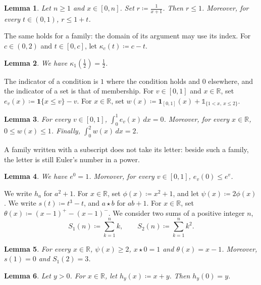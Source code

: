\documentclass{article}
\newtheorem{lemma}{Lemma}
\begin{document}
\begin{lemma}\label{lem:dependent-domain}
Let $n\ge1$ and $x\in[0,n]$.
Set $r\coloneqq\frac{1}{x+1}$.
Then $r\le1$.
Moreover, for every $t\in(0,1)$, $r\le1+t$.
\end{lemma}

The same holds for a family: the domain of its argument may use its index.
For $c\in(0,2)$ and $t\in[0,c]$, let $\kappa_c(t)\coloneqq c-t$.

\begin{lemma}\label{lem:dependent-family}
We have $\kappa_1(\frac12)=\frac12$.
\end{lemma}

The indicator of a condition is $1$ where the condition holds and $0$ elsewhere, and the indicator of a set is that of membership.
For $v\in[0,1]$ and $x\in\mathbb{R}$, set $e_v(x)\coloneqq\mathbf 1\{x\le v\}-v$.
For $x\in\mathbb{R}$, set $w(x)\coloneqq\mathbf{1}_{[0,1]}(x)+\mathbb{1}_{\{1<x,\ x\le2\}}$.

\begin{lemma}\label{lem:indicator}
For every $v\in[0,1]$, $\int_0^1e_v(x)\,dx=0$.
Moreover, for every $x\in\mathbb{R}$, $0\le w(x)\le1$.
Finally, $\int_0^2w(x)\,dx=2$.
\end{lemma}

A family written with a subscript does not take its letter: beside such a family, the
letter is still Euler's number in a power.

\begin{lemma}\label{lem:euler}
We have $e^0=1$.
Moreover, for every $v\in[0,1]$, $e_v(0)\le e^v$.
\end{lemma}

We write $h_a$ for $a^2+1$.
For $x\in\mathbb{R}$, set $\phi(x)\coloneqq x^2+1$, and let $\psi(x)\coloneqq2\phi(x)$.
We write $s(t)\coloneqq t^3-t$, and $a\star b$ for $ab+1$.
For $x\in\mathbb{R}$, set $\theta(x)\coloneqq(x-1)^+-(x-1)^-$.
We consider two sums of a positive integer $n$,
\[
S_1(n)\coloneqq\sum_{k=1}^{n}k,\qquad S_2(n)\coloneqq\sum_{k=1}^{n}k^2.
\]

\begin{lemma}\label{lem:parts}
For every $x\in\mathbb{R}$, $\psi(x)\ge2$, $x\star0=1$ and $\theta(x)=x-1$.
Moreover, $s(1)=0$ and $S_1(2)=3$.
\end{lemma}

\begin{lemma}\label{lem:local}
Let $y>0$. For $x\in\mathbb{R}$, let $h_y(x)\coloneqq x+y$. Then $h_y(0)=y$.
\end{lemma}
\end{document}
